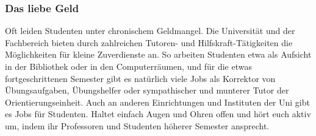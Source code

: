 \subsubsection{Das liebe Geld}

Oft leiden Studenten unter chronischem Geldmangel. Die Universität und der
Fachbereich bieten durch zahlreichen Tutoren- und Hilfskraft-Tätigkeiten die
Möglichkeiten für kleine Zuverdienste an. So arbeiten Studenten etwa als
Aufsicht in der Bibliothek oder in den Computerräumen, und für die etwas
fortgeschrittenen Semester gibt es natürlich viele Jobs als Korrektor von
Übungsaufgaben, Übungshelfer oder sympathischer und munterer Tutor der
Orientierungseinheit. Auch an anderen Einrichtungen und Instituten der Uni gibt
es Jobs für Studenten. Haltet einfach Augen und Ohren offen und hört euch aktiv
um, indem ihr Professoren und Studenten höherer Semester ansprecht.
